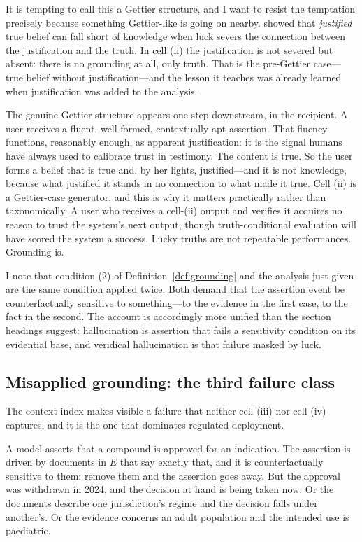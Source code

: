 It is tempting to call this a Gettier structure, and I want to resist the
temptation precisely because something Gettier-like is going on nearby.
\citet{gettier1963} showed that \emph{justified} true belief can fall short of
knowledge when luck severs the connection between the justification and the
truth. In cell (ii) the justification is not severed but absent: there is no
grounding at all, only truth. That is the pre-Gettier case---true belief without
justification---and the lesson it teaches was already learned when justification
was added to the analysis.

The genuine Gettier structure appears one step downstream, in the recipient. A
user receives a fluent, well-formed, contextually apt assertion. That fluency
functions, reasonably enough, as apparent justification: it is the signal humans
have always used to calibrate trust in testimony. The content is true. So the
user forms a belief that is true and, by her lights, justified---and it is not
knowledge, because what justified it stands in no connection to what made it
true. Cell (ii) is a Gettier-case generator, and this is why it matters
practically rather than taxonomically. A user who receives a cell-(ii) output and
verifies it acquires no reason to trust the system's next output, though
truth-conditional evaluation will have scored the system a success. Lucky truths
are not repeatable performances. Grounding is.

I note that condition (2) of Definition~\ref{def:grounding} and the analysis just
given are the same condition applied twice. Both demand that the assertion event
be counterfactually sensitive to something---to the evidence in the first case,
to the fact in the second. The account is accordingly more unified than the
section headings suggest: hallucination is assertion that fails a sensitivity
condition on its evidential base, and veridical hallucination is that failure
masked by luck.

\subsection{Misapplied grounding: the third failure class}
\label{sec:misapplied}

The context index makes visible a failure that neither cell (iii) nor cell (iv)
captures, and it is the one that dominates regulated deployment.

A model asserts that a compound is approved for an indication. The assertion is
driven by documents in $E$ that say exactly that, and it is counterfactually
sensitive to them: remove them and the assertion goes away. But the approval was
withdrawn in 2024, and the decision at hand is being taken now. Or the documents
describe one jurisdiction's regime and the decision falls under another's. Or the
evidence concerns an adult population and the intended use is paediatric.

